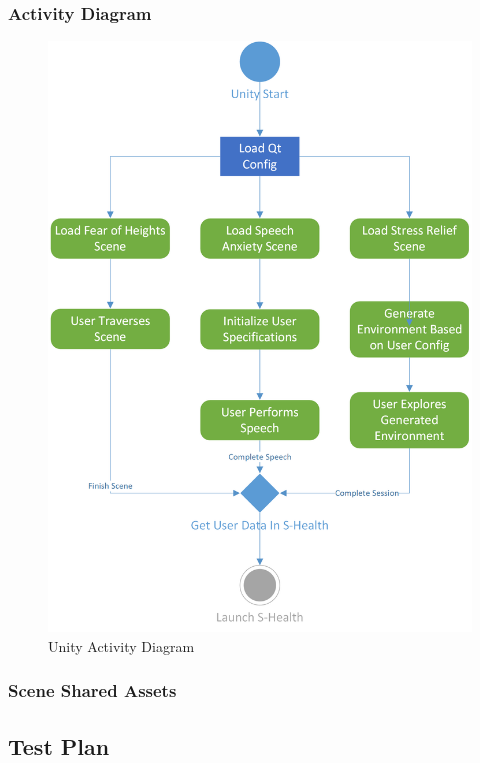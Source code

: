 \documentclass[a4paper,10pt]{article}
\begin{document}
		\subsubsection{Activity Diagram}
				\begin{figure}[H]
					\centerline{\includegraphics[]{unityActivityDiag.png}}
					\caption{Unity Activity Diagram}
					\label{fig:unityactivity}
				\end{figure}
				\pagebreak
		\subsubsection{Scene Shared Assets}
	\subsection{Test Plan}
\end{document}
